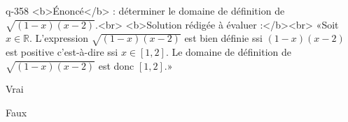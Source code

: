 \begin{truefalse}{q-358}
<b>Énoncé</b> : déterminer le domaine de définition de $\sqrt{(1-x)(x-2)}$.<br> <b>Solution rédigée à évaluer :</b><br>  «Soit $x\in\mathbb{R}$.  L'expression $\sqrt{(1-x)(x-2)}$ est bien définie ssi $(1-x)(x-2)$ est positive c'est-à-dire ssi $x\in[1,2]$. Le domaine de définition de $\sqrt{(1-x)(x-2)}$ est donc $[1,2]$.»
\item* Vrai
\item Faux
\end{truefalse}

